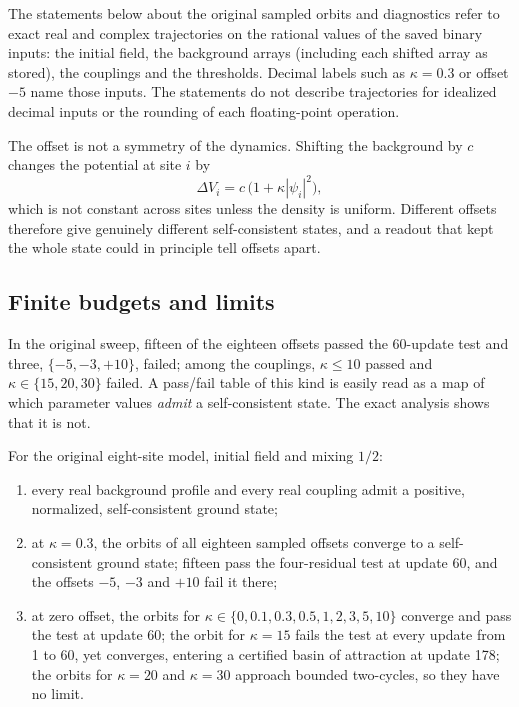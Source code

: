 The statements below about the original sampled orbits and diagnostics
refer to exact real and complex trajectories on the rational values of
the saved binary inputs: the initial field, the background arrays
(including each shifted array as stored), the couplings and the
thresholds. Decimal labels such as \(\kappa=0.3\) or offset \(-5\) name
those inputs. The statements do not describe trajectories for idealized
decimal inputs or the rounding of each floating-point operation.

The offset is not a symmetry of the dynamics. Shifting the background by
\(c\) changes the potential at site \(i\) by
\[\Delta V_i=c\,\bigl(1+\kappa|\psi_i|^2\bigr),\] which is not constant
across sites unless the density is uniform. Different offsets therefore
give genuinely different self-consistent states, and a readout that kept
the whole state could in principle tell offsets apart.

\hypertarget{finite-budgets-and-limits}{%
\subsection{Finite budgets and
limits}\label{finite-budgets-and-limits}}

In the original sweep, fifteen of the eighteen offsets passed the
60-update test and three, \(\{-5,-3,+10\}\), failed; among the
couplings, \(\kappa\le10\) passed and \(\kappa\in\{15,20,30\}\) failed.
A pass/fail table of this kind is easily read as a map of which
parameter values \emph{admit} a self-consistent state. The exact
analysis shows that it is not.

\begin{theorem}\label{thm:orbits}
For the original eight-site model, initial field and mixing $1/2$:
\begin{enumerate}
\item every real background profile and every real coupling admit a positive, normalized, self-consistent ground state;
\item at $\kappa=0.3$, the orbits of all eighteen sampled offsets converge to a self-consistent ground state; fifteen pass
the four-residual test at update 60, and the offsets $-5$, $-3$ and $+10$ fail it there;
\item at zero offset, the orbits for $\kappa\in\{0,0.1,0.3,0.5,1,2,3,5,10\}$ converge and pass the test at update 60; the orbit
for $\kappa=15$ fails the test at every update from 1 to 60, yet converges, entering a certified basin of attraction at
update 178; the orbits for $\kappa=20$ and $\kappa=30$ approach bounded two-cycles, so they have no limit.
\end{enumerate}
\end{theorem}

